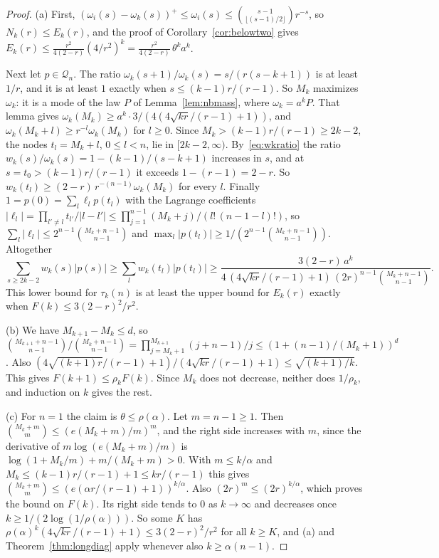 \documentclass[11pt]{article}
\begin{document}
\begin{proof}
(a) First, $(\omega_i(s)-\omega_k(s))^+\le\omega_i(s)\le
\binom{s-1}{\lfloor(s-1)/2\rfloor}r^{-s}$, so $N_k(r)\le E_k(r)$, and the
proof of Corollary~\ref{cor:belowtwo} gives
$E_k(r)\le\frac{r^2}{4(2-r)}(4/r^2)^k=\frac{r^2}{4(2-r)}\,\theta^ka^k$.

Next let $p\in\mathcal Q_n$.  The ratio $\omega_k(s+1)/\omega_k(s)=s/(r(s-k+1))$
is at least $1/r$, and it is at least $1$ exactly when $s\le(k-1)r/(r-1)$.  So
$M_k$ maximizes $\omega_k$: it is a mode of the law $P$ of
Lemma~\ref{lem:nbmass}, where $\omega_k=a^kP$.  That lemma gives
$\omega_k(M_k)\ge a^k\cdot3/(4(4\sqrt{kr}/(r-1)+1))$, and
$\omega_k(M_k+l)\ge r^{-l}\omega_k(M_k)$ for $l\ge0$.  Since
$M_k>(k-1)r/(r-1)\ge2k-2$, the nodes $t_l=M_k+l$, $0\le l<n$, lie in
$[2k-2,\infty)$.  By~\eqref{eq:wkratio} the ratio $w_k(s)/\omega_k(s)=1-(k-1)/(s-k+1)$
increases in $s$, and at $s=t_0>(k-1)r/(r-1)$ it exceeds $1-(r-1)=2-r$.  So
$w_k(t_l)\ge(2-r)\,r^{-(n-1)}\omega_k(M_k)$ for every $l$.  Finally
$1=p(0)=\sum_l\ell_lp(t_l)$ with the Lagrange coefficients
$|\ell_l|=\prod_{l'\ne l}t_{l'}/|l-l'|\le\prod_{j=1}^{n-1}(M_k+j)/(l!\,(n-1-l)!)$,
so $\sum_l|\ell_l|\le2^{n-1}\binom{M_k+n-1}{n-1}$ and
$\max_l|p(t_l)|\ge1/(2^{n-1}\binom{M_k+n-1}{n-1})$.  Altogether
\[
  \sum_{s\ge2k-2}w_k(s)|p(s)|\ge\sum_lw_k(t_l)|p(t_l)|
  \ge\frac{3(2-r)\,a^k}{4\,(4\sqrt{kr}/(r-1)+1)\,(2r)^{n-1}\binom{M_k+n-1}{n-1}} .
\]
This lower bound for $\tau_k(n)$ is at least the upper bound for $E_k(r)$
exactly when $F(k)\le3(2-r)^2/r^2$.

(b) We have $M_{k+1}-M_k\le d$, so
$\binom{M_{k+1}+n-1}{n-1}/\binom{M_k+n-1}{n-1}=\prod_{j=M_k+1}^{M_{k+1}}(j+n-1)/j
\le(1+(n-1)/(M_k+1))^d$.  Also
$(4\sqrt{(k+1)r}/(r-1)+1)/(4\sqrt{kr}/(r-1)+1)\le\sqrt{(k+1)/k}$.  This gives
$F(k+1)\le\rho_kF(k)$.  Since $M_k$ does not decrease, neither does
$1/\rho_k$, and induction on $k$ gives the rest.

(c) For $n=1$ the claim is $\theta\le\rho(\alpha)$.  Let $m=n-1\ge1$.  Then
$\binom{M_k+m}m\le(e(M_k+m)/m)^m$, and the right side increases with $m$,
since the derivative of $m\log(e(M_k+m)/m)$ is $\log(1+M_k/m)+m/(M_k+m)>0$.
With $m\le k/\alpha$ and $M_k\le(k-1)r/(r-1)+1\le kr/(r-1)$ this gives
$\binom{M_k+m}m\le(e(\alpha r/(r-1)+1))^{k/\alpha}$.  Also
$(2r)^m\le(2r)^{k/\alpha}$, which proves the bound on $F(k)$.  Its right side
tends to $0$ as $k\to\infty$ and decreases once $k\ge1/(2\log(1/\rho(\alpha)))$.
So some $K$ has $\rho(\alpha)^k(4\sqrt{kr}/(r-1)+1)\le3(2-r)^2/r^2$ for all
$k\ge K$, and (a) and Theorem~\ref{thm:longdiag} apply whenever also
$k\ge\alpha(n-1)$.
\end{proof}
\end{document}
